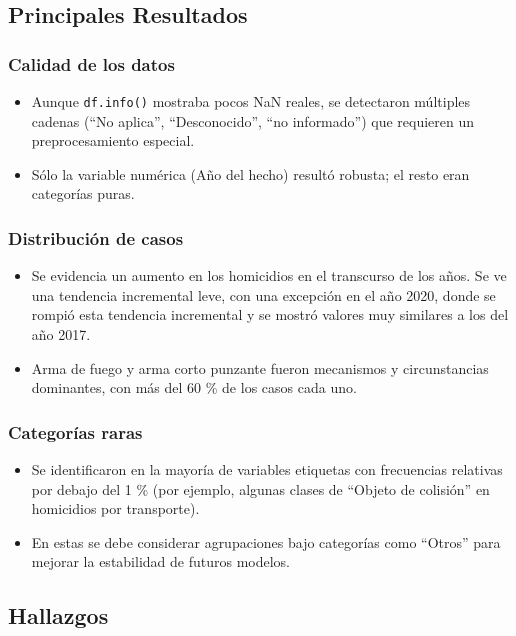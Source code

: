 \documentclass[lettersize,journal]{IEEEtran}
\begin{document}
\subsection{Principales Resultados}

\subsubsection{Calidad de los datos}
\begin{itemize}
    \item Aunque \texttt{df.info()} mostraba pocos NaN reales, se detectaron múltiples cadenas (“No aplica”, “Desconocido”, “no informado”) que requieren un preprocesamiento especial.
    \item Sólo la variable numérica (Año del hecho) resultó robusta; el resto eran categorías puras.
\end{itemize}

\subsubsection{Distribución de casos}
\begin{itemize}
    \item Se evidencia un aumento en los homicidios en el transcurso de los años. Se ve una tendencia incremental leve, con una excepción en el año 2020, donde se rompió esta tendencia incremental y se mostró valores muy similares a los del año 2017.
    \item Arma de fuego y arma corto punzante fueron mecanismos y circunstancias dominantes, con más del 60 \% de los casos cada uno.
\end{itemize}

\subsubsection{Categorías raras}
\begin{itemize}
    \item Se identificaron en la mayoría de variables etiquetas con frecuencias relativas por debajo del 1 \% (por ejemplo, algunas clases de “Objeto de colisión” en homicidios por transporte).
    \item En estas se debe considerar agrupaciones bajo categorías como “Otros” para mejorar la estabilidad de futuros modelos.
\end{itemize}

\subsection{Hallazgos}
\end{document}
